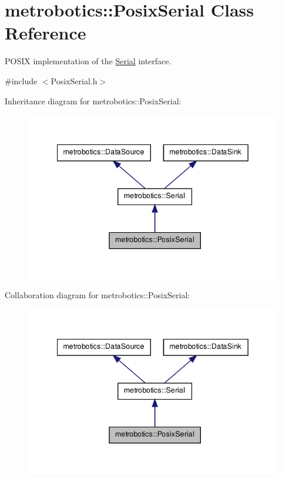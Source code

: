 \hypertarget{classmetrobotics_1_1PosixSerial}{\section{metrobotics\-:\-:\-Posix\-Serial \-Class \-Reference}
\label{classmetrobotics_1_1PosixSerial}
}


\-P\-O\-S\-I\-X implementation of the \hyperlink{classmetrobotics_1_1Serial}{\-Serial} interface.  




{\ttfamily \#include $<$\-Posix\-Serial.\-h$>$}



\-Inheritance diagram for metrobotics\-:\-:\-Posix\-Serial\-:
\nopagebreak
\begin{figure}[H]
\begin{center}
\leavevmode
\includegraphics[width=342pt]{classmetrobotics_1_1PosixSerial__inherit__graph}
\end{center}
\end{figure}


\-Collaboration diagram for metrobotics\-:\-:\-Posix\-Serial\-:
\nopagebreak
\begin{figure}[H]
\begin{center}
\leavevmode
\includegraphics[width=342pt]{classmetrobotics_1_1PosixSerial__coll__graph}
\end{center}
\end{figure}
